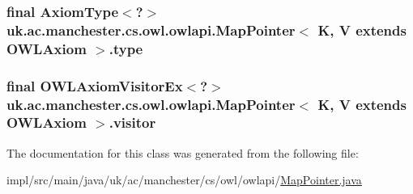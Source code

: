 \hypertarget{classuk_1_1ac_1_1manchester_1_1cs_1_1owl_1_1owlapi_1_1_map_pointer_3_01_k_00_01_v_01extends_01_o_w_l_axiom_01_4_a86ceeb1353e363f730a7f06e4b027149}{
\subsubsection[{type}]{\setlength{\rightskip}{0pt plus 5cm}final Axiom\-Type$<$?$>$ uk.\-ac.\-manchester.\-cs.\-owl.\-owlapi.\-Map\-Pointer$<$ K, V extends {\bf O\-W\-L\-Axiom} $>$.type\hspace{0.3cm}{\ttfamily [private]}}}\label{classuk_1_1ac_1_1manchester_1_1cs_1_1owl_1_1owlapi_1_1_map_pointer_3_01_k_00_01_v_01extends_01_o_w_l_axiom_01_4_a86ceeb1353e363f730a7f06e4b027149}
\hypertarget{classuk_1_1ac_1_1manchester_1_1cs_1_1owl_1_1owlapi_1_1_map_pointer_3_01_k_00_01_v_01extends_01_o_w_l_axiom_01_4_a3485bef61400178b729e43795a518e97}{
\subsubsection[{visitor}]{\setlength{\rightskip}{0pt plus 5cm}final O\-W\-L\-Axiom\-Visitor\-Ex$<$?$>$ uk.\-ac.\-manchester.\-cs.\-owl.\-owlapi.\-Map\-Pointer$<$ K, V extends {\bf O\-W\-L\-Axiom} $>$.visitor\hspace{0.3cm}{\ttfamily [private]}}}\label{classuk_1_1ac_1_1manchester_1_1cs_1_1owl_1_1owlapi_1_1_map_pointer_3_01_k_00_01_v_01extends_01_o_w_l_axiom_01_4_a3485bef61400178b729e43795a518e97}


The documentation for this class was generated from the following file\-:\begin{DoxyCompactItemize}
\item 
impl/src/main/java/uk/ac/manchester/cs/owl/owlapi/\hyperlink{_map_pointer_8java}{Map\-Pointer.\-java}\end{DoxyCompactItemize}
